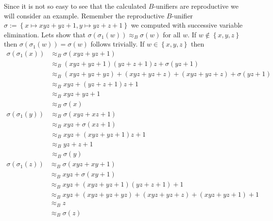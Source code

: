 		Since it is not so easy to see that the calculated $B$-unifiers are reproductive we will consider an example.
		Remember the reproductive $B$-unifier $\sigma:=\left\lbrace x\mapsto xyz+yz+1,y\mapsto yz+z+1\right\rbrace$  we computed with successive variable elimination. Lets show that $\sigma(\sigma_1(w))\approx_B\sigma(w)$ for all $w$. If $w\notin\left\lbrace x,y,z\right\rbrace $ then $\sigma(\sigma_1(w))=\sigma(w)$ follows trivially. If $w\in\left\lbrace x,y,z\right\rbrace $ then
		\begin{align*}
		\sigma(\sigma_1(x))&\approx_B\sigma(xyz+yz+1)\\
		&\approx_B(xyz+yz+1)(yz+z+1)z+\sigma(yz+1)\\
		&\approx_B(xyz+yz+yz)+(xyz+yz+z)+(xyz+yz+z)+\sigma(yz+1)\\
		&\approx_Bxyz+(yz+z+1)z+1\\
		&\approx_Bxyz+yz+1\\
		&\approx_B\sigma(x)\\
		\sigma(\sigma_1(y))&\approx_B\sigma(xyz+xz+1)\\
		&\approx_Bxyz+\sigma(xz+1)\\
		&\approx_Bxyz+(xyz+yz+1)z+1\\
		&\approx_Byz+z+1\\
		&\approx_B\sigma(y)
		\end{align*}
		\begin{align*}
		\sigma(\sigma_1(z))&\approx_B\sigma(xyz+xy+1)\\
		&\approx_Bxyz+\sigma(xy+1)\\
		&\approx_Bxyz+(xyz+yz+1)(yz+z+1)+1\\
		&\approx_Bxyz+(xyz+yz+yz)+(xyz+yz+z)+(xyz+yz+1)+1\\
		&\approx_Bz\\
		&\approx_B\sigma(z)
		\end{align*}
